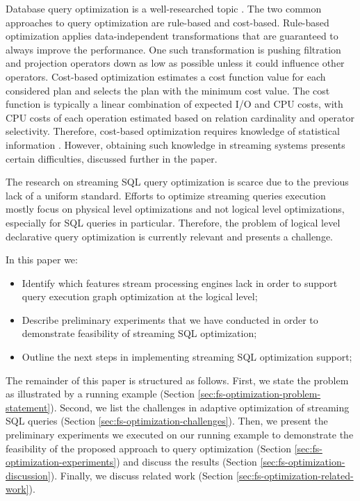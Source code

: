 Database query optimization is a well-researched topic \cite{astrahan1976system, haas1989extensible, graefe1993volcano}. 
The two common approaches to query optimization are rule-based and cost-based. Rule-based optimization applies data-independent transformations that are guaranteed to always improve the performance. One such transformation is pushing filtration and projection operators down as low as possible unless it could influence other operators. Cost-based optimization estimates a cost function value for each considered plan and selects the plan with the minimum cost value. The cost function is typically a linear combination of expected I/O and CPU costs, with CPU costs of each operation estimated based on relation cardinality and operator selectivity. Therefore, cost-based optimization requires knowledge of statistical information \cite{Neumann2018optimization}. However, obtaining such knowledge in streaming systems presents certain difficulties, discussed further in the paper.


The research on streaming SQL query optimization is scarce due to the previous lack of a uniform standard. Efforts to optimize streaming queries execution mostly focus on physical level optimizations \cite{grulich2020grizzly, gedik2009code} and not logical level optimizations, especially for SQL queries in particular. Therefore, the problem of logical level declarative query optimization is currently relevant and presents a challenge.


In this paper we:
\begin{itemize}
    \item Identify which features stream processing engines lack in order to support query execution graph optimization at the logical level;
    \item Describe preliminary experiments that we have conducted in order to demonstrate feasibility of streaming SQL optimization;
    \item Outline the next steps in implementing streaming SQL optimization support; %
\end{itemize}

The remainder of this paper is structured as follows. First, we state the problem as illustrated by a running example (Section \ref{sec:fs-optimization-problem-statement}). Second, we list the challenges in adaptive optimization of streaming SQL queries (Section \ref{sec:fs-optimization-challenges}). Then, we present the preliminary experiments we executed on our running example to demonstrate the feasibility of the proposed approach to query optimization (Section \ref{sec:fs-optimization-experiments}) and discuss the results (Section \ref{sec:fs-optimization-discussion}). Finally, we discuss related work (Section \ref{sec:fs-optimization-related-work}).     



